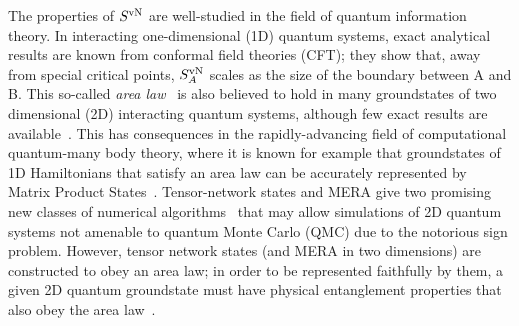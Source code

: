 \documentclass[prl,aps,twocolumn,floatfix,amsmath,amssymb,superscriptaddress,tightenlines]{revtex4}
\begin{document}
The properties of $S^{ \rm vN}$ are well-studied in the field of quantum information theory.
In interacting one-dimensional (1D) quantum systems, exact analytical results are known from conformal
field theories (CFT); they show that, away from special critical points,
$S^{ \rm vN}_A$ scales as the size of the boundary between A and B.
This so-called {\it area law}~\cite{Shredder} is also believed to hold in many
groundstates of two dimensional (2D) interacting quantum systems,
although few exact results are available~\cite{ALreview}.  This has 
consequences in the
rapidly-advancing field of computational quantum-many body theory, where
it is known for example that groundstates of 1D Hamiltonians that satisfy an area law
can be accurately represented by Matrix Product States~\cite{MPS_DMRG}.
Tensor-network states and MERA give two promising new classes of numerical
algorithms~\cite{PEPS1,MERA} 
that may allow simulations of 2D quantum systems not amenable to quantum Monte Carlo (QMC) due to
the notorious sign problem.  However, tensor network states (and MERA in two dimensions)
are constructed to obey an area law; in order to be represented faithfully
by them, a given 2D quantum groundstate must have physical entanglement
properties that also obey the area law~\cite{ALreview}.


\end{document}
